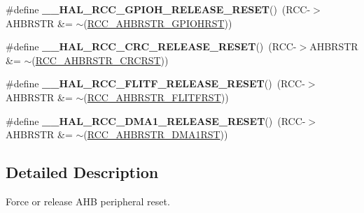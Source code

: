 \begin{DoxyCompactItemize}
\item 
\hypertarget{group___r_c_c___peripheral___clock___force___release_gaaf11aa8bacb98c4e567bbaa58635acec}{\#define {\bfseries \-\_\-\-\_\-\-H\-A\-L\-\_\-\-R\-C\-C\-\_\-\-G\-P\-I\-O\-H\-\_\-\-R\-E\-L\-E\-A\-S\-E\-\_\-\-R\-E\-S\-E\-T}()~(R\-C\-C-\/$>$A\-H\-B\-R\-S\-T\-R \&= $\sim$(\hyperlink{group___peripheral___registers___bits___definition_ga4641a35381254234afb284547689e43c}{R\-C\-C\-\_\-\-A\-H\-B\-R\-S\-T\-R\-\_\-\-G\-P\-I\-O\-H\-R\-S\-T}))}\label{group___r_c_c___peripheral___clock___force___release_gaaf11aa8bacb98c4e567bbaa58635acec}

\item 
\hypertarget{group___r_c_c___peripheral___clock___force___release_gab7426b24c0b9d6aaec3c17f98735a178}{\#define {\bfseries \-\_\-\-\_\-\-H\-A\-L\-\_\-\-R\-C\-C\-\_\-\-C\-R\-C\-\_\-\-R\-E\-L\-E\-A\-S\-E\-\_\-\-R\-E\-S\-E\-T}()~(R\-C\-C-\/$>$A\-H\-B\-R\-S\-T\-R \&= $\sim$(\hyperlink{group___peripheral___registers___bits___definition_ga6e955ed3881dfd4a3a97b1bb13da0dde}{R\-C\-C\-\_\-\-A\-H\-B\-R\-S\-T\-R\-\_\-\-C\-R\-C\-R\-S\-T}))}\label{group___r_c_c___peripheral___clock___force___release_gab7426b24c0b9d6aaec3c17f98735a178}

\item 
\hypertarget{group___r_c_c___peripheral___clock___force___release_gacc2ef3e73c5213f095c1c83370c7aaf1}{\#define {\bfseries \-\_\-\-\_\-\-H\-A\-L\-\_\-\-R\-C\-C\-\_\-\-F\-L\-I\-T\-F\-\_\-\-R\-E\-L\-E\-A\-S\-E\-\_\-\-R\-E\-S\-E\-T}()~(R\-C\-C-\/$>$A\-H\-B\-R\-S\-T\-R \&= $\sim$(\hyperlink{group___peripheral___registers___bits___definition_ga14792d6944967d58822d13c720f83ee8}{R\-C\-C\-\_\-\-A\-H\-B\-R\-S\-T\-R\-\_\-\-F\-L\-I\-T\-F\-R\-S\-T}))}\label{group___r_c_c___peripheral___clock___force___release_gacc2ef3e73c5213f095c1c83370c7aaf1}

\item 
\hypertarget{group___r_c_c___peripheral___clock___force___release_ga8f7eef8316c35175df11d77f5106d334}{\#define {\bfseries \-\_\-\-\_\-\-H\-A\-L\-\_\-\-R\-C\-C\-\_\-\-D\-M\-A1\-\_\-\-R\-E\-L\-E\-A\-S\-E\-\_\-\-R\-E\-S\-E\-T}()~(R\-C\-C-\/$>$A\-H\-B\-R\-S\-T\-R \&= $\sim$(\hyperlink{group___peripheral___registers___bits___definition_ga97c9487ca04b0a1a992d0f2e00df739c}{R\-C\-C\-\_\-\-A\-H\-B\-R\-S\-T\-R\-\_\-\-D\-M\-A1\-R\-S\-T}))}\label{group___r_c_c___peripheral___clock___force___release_ga8f7eef8316c35175df11d77f5106d334}

\end{DoxyCompactItemize}


\subsection{Detailed Description}
Force or release A\-H\-B peripheral reset. 